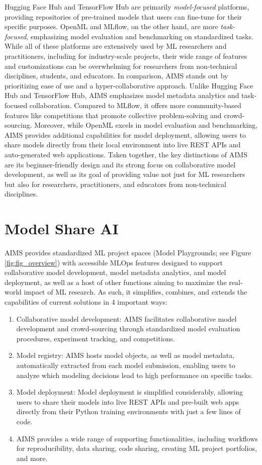 Hugging Face Hub and TensorFlow Hub are primarily \textit{model-focused} platforms, providing repositories of pre-trained models that users can fine-tune for their specific purposes. OpenML and MLflow, on the other hand, are more \textit{task-focused}, emphasizing model evaluation and benchmarking on standardized tasks. While all of these platforms are extensively used by ML researchers and practitioners, including for industry-scale projects, their wide range of features and customizations can be overwhelming for researchers from non-technical disciplines, students, and educators. In comparison, AIMS stands out by prioritizing ease of use and a hyper-collaborative approach. Unlike Hugging Face Hub and TensorFlow Hub, AIMS emphasizes model metadata analytics and task-focused collaboration. Compared to MLflow, it offers more community-based features like competitions that promote collective problem-solving and crowd-sourcing. Moreover, while OpenML excels in model evaluation and benchmarking, AIMS provides additional capabilities for model deployment, allowing users to share models directly from their local environment into live REST APIs and auto-generated web applications. Taken together, the key distinctions of AIMS are its beginner-friendly design and its strong focus on collaborative model development, as well as its goal of providing value not just for ML researchers but also for researchers, practitioners, and educators from non-technical disciplines.

\section{Model Share AI}
AIMS provides standardized ML project spaces (Model Playgrounds; see Figure \ref{fig:fig_overview}) with accessible MLOps features designed to support collaborative model development, model metadata analytics, and model deployment, as well as a host of other functions aiming to maximize the real-world impact of ML research. As such, it simplifies, combines, and extends the capabilities of current solutions in 4 important ways:

\begin{enumerate}
    \item Collaborative model development: AIMS facilitates collaborative model development and crowd-sourcing through standardized model evaluation procedures, experiment tracking, and competitions. 
    \item Model registry: AIMS hosts model objects, as well as model metadata, automatically extracted from each model submission, enabling users to analyze which modeling decisions lead to high performance on specific tasks.
    \item Model deployment: Model deployment is simplified considerably, allowing users to share their models into live REST APIs and pre-built web apps directly from their Python training environments with just a few lines of code.
    \item AIMS provides a wide range of supporting functionalities, including workflows for reproducibility, data sharing, code sharing, creating ML project portfolios, and more.
\end{enumerate}


